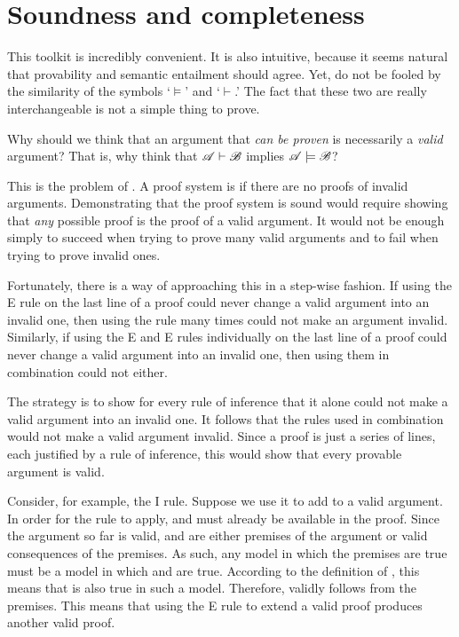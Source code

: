 \section{Soundness and completeness}

This toolkit is incredibly convenient. It is also intuitive, because it seems natural that provability and semantic entailment should agree. Yet, do not be fooled by the similarity of the symbols `$\models$' and `$\vdash$.' The fact that these two are really interchangeable is not a simple thing to prove.

Why should we think that an argument that \emph{can be proven} is necessarily a \emph{valid} argument? That is, why think that $\mathscr{A}\vdash\mathscr{B}$ implies $\mathscr{A}\models\mathscr{B}$?

This is the problem of . A proof system is  if there are no proofs of invalid arguments. Demonstrating that the proof system is sound would require showing that \emph{any} possible proof is the proof of a valid argument. It would not be enough simply to succeed when trying to prove many valid arguments and to fail when trying to prove invalid ones.

Fortunately, there is a way of approaching this in a step-wise fashion. If using the {\eand}E rule on the last line of a proof could never change a valid argument into an invalid one, then using the rule many times could not make an argument invalid. Similarly, if using the {\eand}E and {\eor}E rules individually on the last line of a proof could never change a valid argument into an invalid one, then using them in combination could not either.

The strategy is to show for every rule of inference that it alone could not make a valid argument into an invalid one. It follows that the rules used in combination would not make a valid argument invalid. Since a proof is just a series of lines, each justified by a rule of inference, this would show that every provable argument is valid.

Consider, for example, the {\eand}I rule. Suppose we use it to add \eand{} to a valid argument. In order for the rule to apply,  and  must already be available in the proof. Since the argument so far is valid,  and  are either premises of the argument or valid consequences of the premises. As such, any model in which the premises are true must be a model in which  and  are true. According to the definition of , this means that \eand{} is also true in such a model. Therefore, \eand{} validly follows from the premises. This means that using the {\eand}E rule to extend a valid proof produces another valid proof.

